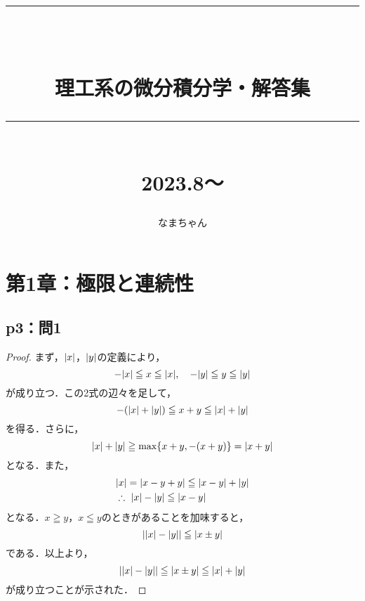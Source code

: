 \documentclass[uplatex,dvipdfmx,a4paper,10pt,fleqn]{jsarticle}
\newenvironment{tleftbar}{\begin{tbleftline}\setlength{\parindent}{1zw}}{\end{tbleftline}}
\newcommand{\HRule}[1]{\rule{\linewidth}{#1}}
\begin{document}
\title{ \normalsize \textsc{}
		\\ [2.0cm]
		\HRule{1.5pt} \\
		\huge {\uppercase{理工系の微分積分学・解答集}
		\HRule{2.0pt} \\ [0.6cm] \LARGE{2023.8〜} \vspace*{10\baselineskip}}
		}
\date{}
\author{\LARGE なまちゃん}
\maketitle

\newpage 
\begin{multicols*}{3}
    \tableofcontents
\end{multicols*}
\newpage
\section*{第1章：極限と連続性}

\subsection*{p3：問1}

\begin{tleftbar}
    \begin{proof}
        まず，$\abs{x}$，$\abs{y}$の定義により，
        \[
            -\abs{x} \leqq x \leqq  \abs{x},\quad -\abs{y} \leqq y \leqq  \abs{y}
        \]
        が成り立つ．この2式の辺々を足して，
        \[
            -(\abs{x}+\abs{y}) \leqq x+y \leqq \abs{x}+\abs{y}
        \]
        を得る．さらに，
        \[
            \abs{x} + \abs{y} \geqq \max \{ x+y , -(x+y) \} = \abs{x+y}
        \]
        となる．また，
        \begin{align*}
           &  \abs{x}= \abs{x-y +y} \leqq \abs{x-y} +\abs{y} \\
           & \therefore ~ \abs{x} - \abs{y} \leqq \abs{x-y}
        \end{align*}
        となる．$x \geqq y$，$x \leqq y$のときがあることを加味すると，
        \[
            \abs{\abs{x} - \abs{y}} \leqq \abs{x \pm y} 
        \]
        である．以上より，
        \[
            \abs{\abs{x} - \abs{y}} \leqq \abs{x \pm y} \leqq \abs{x}+\abs{y}
        \]
        が成り立つことが示された．
    \end{proof}
\end{tleftbar}
\end{document}
